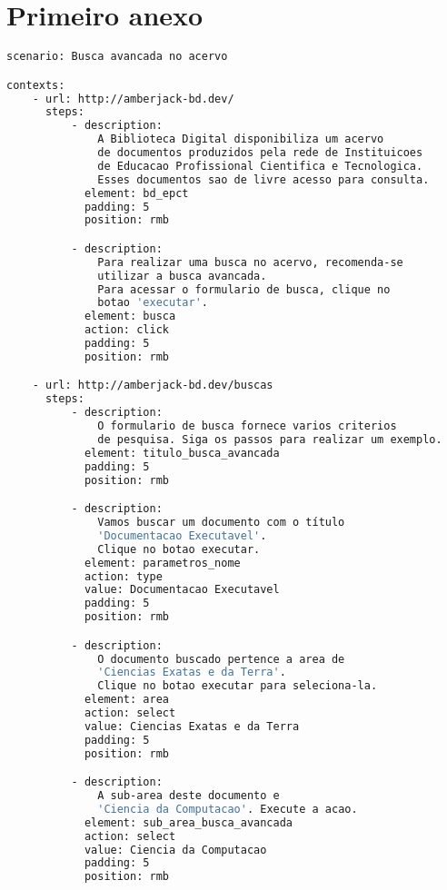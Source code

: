 \apendice \chapter{Primeiro anexo}
\label{apendice}

{\singlespace
\begin{lstlisting}[caption=Cenário descrito em YAML,language=bash,label={lst:anexo_yaml}]
scenario: Busca avancada no acervo

contexts:
    - url: http://amberjack-bd.dev/
      steps:
          - description:
              A Biblioteca Digital disponibiliza um acervo
              de documentos produzidos pela rede de Instituicoes
              de Educacao Profissional Cientifica e Tecnologica.
              Esses documentos sao de livre acesso para consulta.
            element: bd_epct
            padding: 5
            position: rmb

          - description:
              Para realizar uma busca no acervo, recomenda-se
              utilizar a busca avancada.
              Para acessar o formulario de busca, clique no
              botao 'executar'.
            element: busca
            action: click
            padding: 5
            position: rmb

    - url: http://amberjack-bd.dev/buscas
      steps:
          - description:
              O formulario de busca fornece varios criterios
              de pesquisa. Siga os passos para realizar um exemplo.
            element: titulo_busca_avancada
            padding: 5
            position: rmb

          - description:
              Vamos buscar um documento com o título
              'Documentacao Executavel'.
              Clique no botao executar.
            element: parametros_nome
            action: type
            value: Documentacao Executavel
            padding: 5
            position: rmb

          - description:
              O documento buscado pertence a area de
              'Ciencias Exatas e da Terra'.
              Clique no botao executar para seleciona-la.
            element: area
            action: select
            value: Ciencias Exatas e da Terra
            padding: 5
            position: rmb

          - description:
              A sub-area deste documento e
              'Ciencia da Computacao'. Execute a acao.
            element: sub_area_busca_avancada
            action: select
            value: Ciencia da Computacao
            padding: 5
            position: rmb


\end{lstlisting}}
